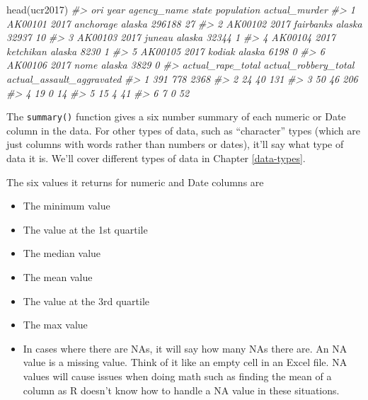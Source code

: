 \documentclass[
]{krantz}
\makeatletter
\newenvironment{Shaded}{\begin{snugshade}}{\end{snugshade}}
\newcommand{\CommentTok}[1]{\textcolor[rgb]{0.37,0.37,0.37}{\textit{#1}}}
\newcommand{\FunctionTok}[1]{\textcolor[rgb]{0,0,0}{#1}}
\newcommand{\NormalTok}[1]{#1}
\providecommand{\tightlist}{%
  \setlength{\itemsep}{0pt}\setlength{\parskip}{0pt}}
\newenvironment{kframe}{%
\medskip{}
\setlength{\fboxsep}{.8em}
 \def\at@end@of@kframe{}%
 \ifinner\ifhmode%
  \def\at@end@of@kframe{\end{minipage}}%
  \begin{minipage}{\columnwidth}%
 \fi\fi%
 \def\FrameCommand##1{\hskip\@totalleftmargin \hskip-\fboxsep
 \colorbox{shadecolor}{##1}\hskip-\fboxsep
     \hskip-\linewidth \hskip-\@totalleftmargin \hskip\columnwidth}%
 \MakeFramed {\advance\hsize-\width
   \@totalleftmargin\z@ \linewidth\hsize
   \@setminipage}}%
 {\par\unskip\endMakeFramed%
 \at@end@of@kframe}
\renewenvironment{Shaded}{\begin{kframe}}{\end{kframe}}
\makeatother
\begin{document}
\begin{Shaded}
\begin{Highlighting}[]
\FunctionTok{head}\NormalTok{(ucr2017)}
\CommentTok{\#\textgreater{}       ori year agency\_name  state population actual\_murder}
\CommentTok{\#\textgreater{} 1 AK00101 2017   anchorage alaska     296188            27}
\CommentTok{\#\textgreater{} 2 AK00102 2017   fairbanks alaska      32937            10}
\CommentTok{\#\textgreater{} 3 AK00103 2017      juneau alaska      32344             1}
\CommentTok{\#\textgreater{} 4 AK00104 2017   ketchikan alaska       8230             1}
\CommentTok{\#\textgreater{} 5 AK00105 2017      kodiak alaska       6198             0}
\CommentTok{\#\textgreater{} 6 AK00106 2017        nome alaska       3829             0}
\CommentTok{\#\textgreater{}   actual\_rape\_total actual\_robbery\_total actual\_assault\_aggravated}
\CommentTok{\#\textgreater{} 1               391                  778                      2368}
\CommentTok{\#\textgreater{} 2                24                   40                       131}
\CommentTok{\#\textgreater{} 3                50                   46                       206}
\CommentTok{\#\textgreater{} 4                19                    0                        14}
\CommentTok{\#\textgreater{} 5                15                    4                        41}
\CommentTok{\#\textgreater{} 6                 7                    0                        52}
\end{Highlighting}
\end{Shaded}

The \texttt{summary()} function gives a six number summary of each numeric or Date column in the data. For other types of data, such as ``character'' types (which are just columns with words rather than numbers or dates), it'll say what type of data it is. We'll cover different types of data in Chapter \ref{data-types}.

The six values it returns for numeric and Date columns are

\begin{itemize}
\tightlist
\item
  The minimum value
\item
  The value at the 1st quartile
\item
  The median value
\item
  The mean value
\item
  The value at the 3rd quartile
\item
  The max value
\item
  In cases where there are NAs, it will say how many NAs there are. An NA value is a missing value. Think of it like an empty cell in an Excel file. NA values will cause issues when doing math such as finding the mean of a column as R doesn't know how to handle a NA value in these situations.
\end{itemize}
\end{document}
